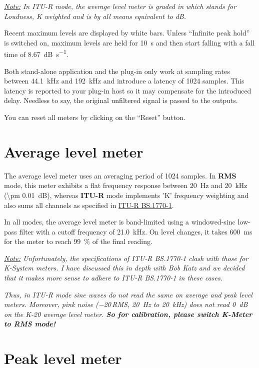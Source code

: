 \emph{\underline{Note:} In ITU-R mode, the average level meter is
  graded in \emph{\si{\LK}} which stands for \emph{Loudness, K
    weighted} and is by all means equivalent to \si{\dB}.}

Recent maximum levels are displayed by white bars.  Unless ``Infinite
peak hold'' is switched on, maximum levels are held for
\SI{10}{\second} and then start falling with a fall time of
\SI{8.67}{\dB\per\second}.

Both stand-alone application and the plug-in only work at sampling
rates between \SI{44.1}{\kilo\hertz} and \SI{192}{\kilo\hertz} and
introduce a latency of \num{1024} samples.  This latency is reported
to your plug-in host so it may compensate for the introduced delay.
Needless to say, the original unfiltered signal is passed to the
outputs.

You can reset all meters by clicking on the ``Reset'' button.

\section{Average level meter}

The average level meter uses an averaging period of \num{1024}
samples.  In \textbf{RMS} mode, this meter exhibits a flat frequency
response between \SI{20}{\hertz} and \SI{20}{\kilo\hertz} (\SI{\pm
  0.01}{\dB}), whereas \textbf{ITU-R} mode implements 'K' frequency
weighting and also sums all channels as specified in
\href{http://www.itu.int/rec/R-REC-BS.1770}{ITU-R BS.1770-1}.

In all modes, the average level meter is band-limited using a
windowed-sinc low-pass filter with a cutoff frequency of
\SI{21.0}{\kilo\hertz}.  On level changes, it takes
\SI{600}{\milli\second} for the meter to reach \SI{99}{\percent} of
the final reading.

\emph{\underline{Note:} Unfortunately, the specifications of ITU-R
  BS.1770-1 clash with those for K-System meters.  I have discussed
  this in depth with Bob Katz and we decided that it makes more sense
  to adhere to ITU-R BS.1770-1 in these cases.}

\emph{Thus, in ITU-R mode sine waves do \emph{not} read the same on
  average and peak level meters.  Moreover, pink noise
  (\SI{-20}{\dBFS}\,RMS, \SI{20}{\hertz} to \SI{20}{\kilo\hertz}) does
  \emph{not} read \SI{0}{\dB} on the K-20 average level meter.
  \textbf{So for calibration, please switch K-Meter to RMS mode!}}

\section{Peak level meter}

